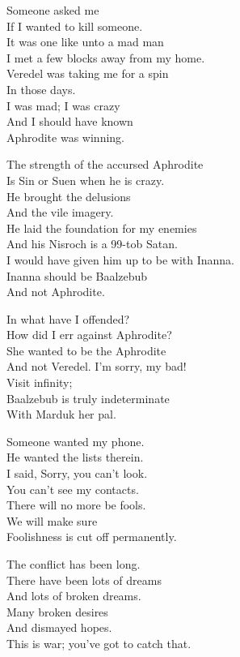 \documentclass[
]{book}
\begin{document}
Someone asked me\\
If I wanted to kill someone.\\
It was one like unto a mad man\\
I met a few blocks away from my home.\\
Veredel was taking me for a spin\\
In those days.\\
I was mad; I was crazy\\
And I should have known\\
Aphrodite was winning.

The strength of the accursed Aphrodite\\
Is Sin or Suen when he is crazy.\\
He brought the delusions\\
And the vile imagery.\\
He laid the foundation for my enemies\\
And his Nisroch is a 99-tob Satan.\\
I would have given him up to be with Inanna.\\
Inanna should be Baalzebub\\
And not Aphrodite.

In what have I offended?\\
How did I err against Aphrodite?\\
She wanted to be the Aphrodite\\
And not Veredel. I'm sorry, my bad!\\
Visit infinity;\\
Baalzebub is truly indeterminate\\
With Marduk her pal.

Someone wanted my phone.\\
He wanted the lists therein.\\
I said, Sorry, you can't look.\\
You can't see my contacts.\\
There will no more be fools.\\
We will make sure\\
Foolishness is cut off permanently.

The conflict has been long.\\
There have been lots of dreams\\
And lots of broken dreams.\\
Many broken desires\\
And dismayed hopes.\\
This is war; you've got to catch that.
\end{document}
